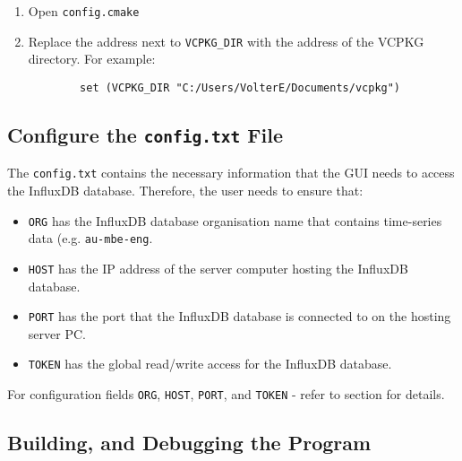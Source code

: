 \documentclass{article}
\begin{document}
\begin{enumerate}
    \item Open \texttt{config.cmake}
    
    \item Replace the address next to \texttt{VCPKG\_DIR} with the address of the VCPKG directory. For example:
    \begin{verbatim}
        set (VCPKG_DIR "C:/Users/VolterE/Documents/vcpkg")
    \end{verbatim}
\end{enumerate}

\subsection{Configure the \texttt{config.txt} File}
The \texttt{config.txt} contains the necessary information that the GUI needs to access the InfluxDB database. Therefore, the user needs to ensure that:

\begin{itemize}
        \item \texttt{ORG} has the InfluxDB database organisation name that contains time-series data (e.g. \texttt{au-mbe-eng}.
        
        \item \texttt{HOST} has the IP address of the server computer hosting the InfluxDB database.
        
        \item \texttt{PORT} has the port that the InfluxDB database is connected to on the hosting server PC.

        \item \texttt{TOKEN} has the global read/write access for the InfluxDB database.
\end{itemize}

\noindent
For configuration fields \texttt{ORG}, \texttt{HOST}, \texttt{PORT}, and \texttt{TOKEN} - refer to section \textbf{} for details.

\subsection{Building, and Debugging the Program}
\end{document}
